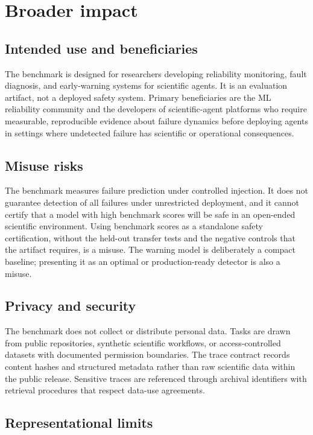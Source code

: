 \section*{Broader impact}

\subsection{Intended use and beneficiaries}

The benchmark is designed for researchers developing reliability monitoring,
fault diagnosis, and early-warning systems for scientific agents. It is an
evaluation artifact, not a deployed safety system. Primary beneficiaries
are the ML reliability community and the developers of scientific-agent
platforms who require measurable, reproducible evidence about failure
dynamics before deploying agents in settings where undetected failure has
scientific or operational consequences.

\subsection{Misuse risks}

The benchmark measures failure prediction under controlled injection. It
does not guarantee detection of all failures under unrestricted deployment,
and it cannot certify that a model with high benchmark scores will be safe
in an open-ended scientific environment. Using benchmark scores as a
standalone safety certification, without the held-out transfer tests and
the negative controls that the artifact requires, is a misuse. The warning
model is deliberately a compact baseline; presenting it as an optimal or
production-ready detector is also a misuse.

\subsection{Privacy and security}

The benchmark does not collect or distribute personal data. Tasks are drawn
from public repositories, synthetic scientific workflows, or access-controlled
datasets with documented permission boundaries. The trace contract records
content hashes and structured metadata rather than raw scientific data within
the public release. Sensitive traces are referenced through archival
identifiers with retrieval procedures that respect data-use agreements.

\subsection{Representational limits}

